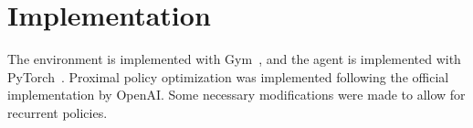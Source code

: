 \section{Implementation}

The environment is implemented with Gym~\cite{brockman_gym_2016}, and the agent is implemented with PyTorch~\cite{paszke_pytorch_nodate}.
Proximal policy optimization was implemented following the official implementation by OpenAI.
Some necessary modifications were made to allow for recurrent policies.


















